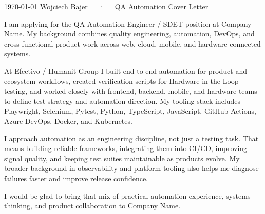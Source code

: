 \documentclass[11pt, a4paper]{awesome-cv}
\begin{document}
\makecvheader[R]
\makecvfooter
  {\today}
  {Wojciech Bajer~~~·~~~QA Automation Cover Letter}
  {}

\makelettertitle

\begin{cvletter}

I am applying for the QA Automation Engineer / SDET position at Company Name. My background combines quality engineering, automation, DevOps, and cross-functional product work across web, cloud, mobile, and hardware-connected systems.

At Efectivo / Humanit Group I built end-to-end automation for product and ecosystem workflows, created verification scripts for Hardware-in-the-Loop testing, and worked closely with frontend, backend, mobile, and hardware teams to define test strategy and automation direction. My tooling stack includes Playwright, Selenium, Pytest, Python, TypeScript, JavaScript, GitHub Actions, Azure DevOps, Docker, and Kubernetes.

I approach automation as an engineering discipline, not just a testing task. That means building reliable frameworks, integrating them into CI/CD, improving signal quality, and keeping test suites maintainable as products evolve. My broader background in observability and platform tooling also helps me diagnose failures faster and improve release confidence.

I would be glad to bring that mix of practical automation experience, systems thinking, and product collaboration to Company Name.

\end{cvletter}

\makeletterclosing
\end{document}
